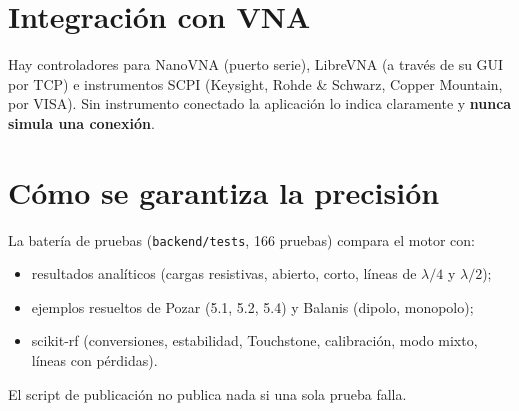 \section{Integración con VNA}
Hay controladores para NanoVNA (puerto serie), LibreVNA (a través de su GUI por TCP) e instrumentos SCPI (Keysight, Rohde \& Schwarz,
Copper Mountain, por VISA). Sin instrumento conectado la aplicación lo indica claramente y \textbf{nunca simula una conexión}.

\section{Cómo se garantiza la precisión}
La batería de pruebas (\texttt{backend/tests}, 166 pruebas) compara el motor con:
\begin{itemize}
\item resultados analíticos (cargas resistivas, abierto, corto, líneas de $\lambda/4$ y $\lambda/2$);
\item ejemplos resueltos de Pozar (5.1, 5.2, 5.4) y Balanis (dipolo, monopolo);
\item scikit-rf (conversiones, estabilidad, Touchstone, calibración, modo mixto, líneas con pérdidas).
\end{itemize}
El script de publicación no publica nada si una sola prueba falla.
